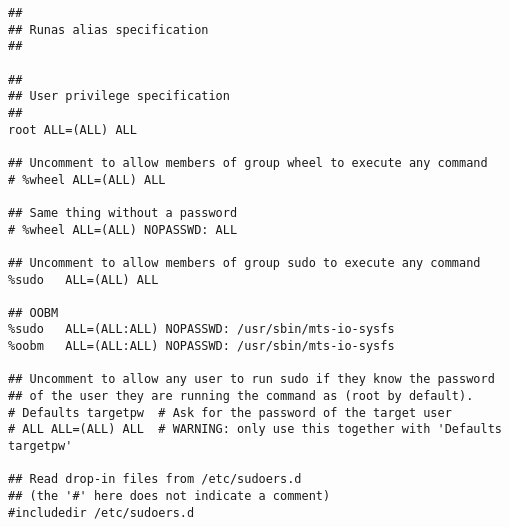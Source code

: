 \begin{verbatim}
##
## Runas alias specification
##

##
## User privilege specification
##
root ALL=(ALL) ALL

## Uncomment to allow members of group wheel to execute any command
# %wheel ALL=(ALL) ALL

## Same thing without a password
# %wheel ALL=(ALL) NOPASSWD: ALL

## Uncomment to allow members of group sudo to execute any command
%sudo	ALL=(ALL) ALL

## OOBM
%sudo	ALL=(ALL:ALL) NOPASSWD: /usr/sbin/mts-io-sysfs
%oobm	ALL=(ALL:ALL) NOPASSWD: /usr/sbin/mts-io-sysfs

## Uncomment to allow any user to run sudo if they know the password
## of the user they are running the command as (root by default).
# Defaults targetpw  # Ask for the password of the target user
# ALL ALL=(ALL) ALL  # WARNING: only use this together with 'Defaults targetpw'

## Read drop-in files from /etc/sudoers.d
## (the '#' here does not indicate a comment)
#includedir /etc/sudoers.d
\end{verbatim}

